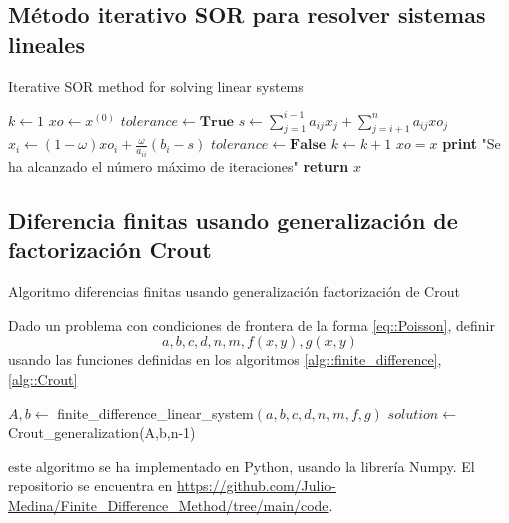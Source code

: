 \documentclass[a4paper]{article}
\begin{document}
\subsection{Método iterativo SOR para resolver sistemas lineales}
\begin{algorithm}[H]
\caption{Iterative SOR method for solving linear systems}\label{alg::SOR}
\begin{algorithmic}[H]
\State $k \gets 1$
\State $xo \gets x^{(0)}$
\State $tolerance\gets \textbf{True}$
\State $s \gets \sum_{j=1}^{i-1} a_{ij}x_j + \sum_{j=i+1}^{n} a_{ij}xo_j$
\State $x_i \gets (1-\omega) xo_i + \frac{\omega}{a_{ii}} (b_i - s)$
\EndFor
{}
\State $tolerance\gets \textbf{False}$
\EndIf
\State $k \gets k+1$
\State $xo=x$
\EndWhile
{}
\State \textbf{print} "Se ha alcanzado el número máximo de iteraciones"
\EndIf
\State \textbf{return} $x$
\EndFunction
\end{algorithmic}
\end{algorithm}

\subsection{Diferencia finitas usando generalización de factorización Crout}
\begin{algorithm}
\caption{Algoritmo diferencias finitas usando generalización factorización de Crout}\label{alg::finite_diff_Crout}
Dado un problema con condiciones de frontera de la forma \ref{eq::Poisson}, definir
\begin{equation*}
a,b,c,d,n,m,f(x,y),g(x,y)
\end{equation*}
usando las funciones definidas en los algoritmos \ref{alg::finite_difference}, \ref{alg::Crout}
\begin{algorithmic}
\State $A, b\gets$ finite\_difference\_linear\_system$(a,b,c,d,n,m,f,g)$
\State $solution\gets $ Crout\_generalization(A,b,n-1)
\end{algorithmic}
\end{algorithm}
este algoritmo se ha implementado en Python, usando la librería Numpy. El repositorio se encuentra en \url{https://github.com/Julio-Medina/Finite_Difference_Method/tree/main/code}.
\end{document}
